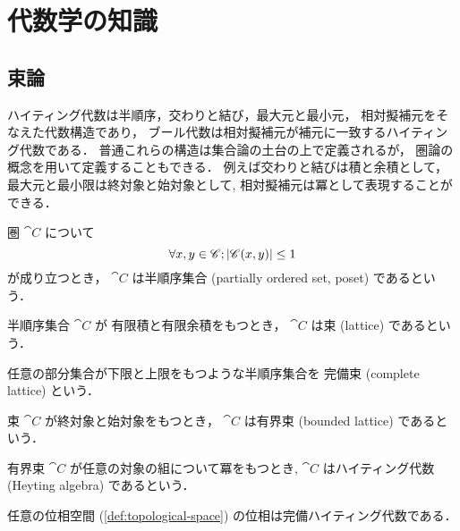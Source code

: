 \documentclass[titlepage]{ltjsreport}
\begin{document}
\chapter{代数学の知識}

\section{束論}

ハイティング代数は半順序，交わりと結び，最大元と最小元，
相対擬補元をそなえた代数構造であり，
ブール代数は相対擬補元が補元に一致するハイティング代数である．
普通これらの構造は集合論の土台の上で定義されるが，
圏論の概念を用いて定義することもできる．
例えば交わりと結びは積と余積として，最大元と最小限は終対象と始対象として,
相対擬補元は冪として表現することができる．

\begin{definition}[半順序集合]
  圏 $\cat{C}$ について
  \begin{equation}
    \forall x,y\in\mathscr{C};|\mathscr{C}(x,y)|\le1
  \end{equation}
  が成り立つとき，
  $\cat{C}$ は半順序集合 (partially ordered set, poset)
  であるという．
\end{definition}

\begin{definition}[束]
  半順序集合 $\cat{C}$ が
  有限積と有限余積をもつとき，
  $\cat{C}$ は束 (lattice) であるという．
\end{definition}

\begin{definition}[完備束]\label{def:complete-lattice}%
  任意の部分集合が下限と上限をもつような半順序集合を
  完備束
  (complete lattice)
  という．
\end{definition}

\begin{definition}[有界束]
  束 $\cat{C}$ が終対象と始対象をもつとき，
  $\cat{C}$ は有界束 (bounded lattice) であるという．
\end{definition}

\begin{definition}[ハイティング代数]\label{def:heyting-algebra}%
  有界束 $\cat{C}$ が任意の対象の組について冪をもつとき,
  $\cat{C}$ はハイティング代数 (Heyting algebra) であるという．
\end{definition}

\begin{theorem}
  任意の位相空間 (\cref{def:topological-space})
  の位相は完備ハイティング代数である．
\end{theorem}
\end{document}
